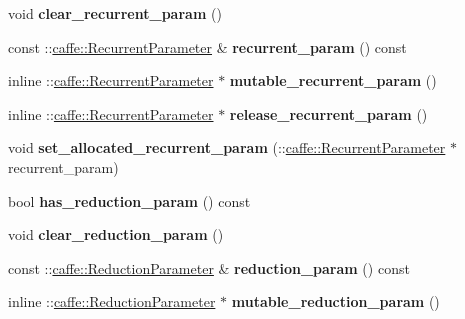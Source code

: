 \begin{DoxyCompactItemize}
void {\bfseries clear\+\_\+recurrent\+\_\+param} ()
\item 
\mbox{\label{classcaffe_1_1_layer_parameter_af2c30ec612074b330d4315ff9fb8c818}} 
const \+::\mbox{\hyperlink{classcaffe_1_1_recurrent_parameter}{caffe\+::\+Recurrent\+Parameter}} \& {\bfseries recurrent\+\_\+param} () const
\item 
\mbox{\label{classcaffe_1_1_layer_parameter_a5899b0c9e04294deaa4a78ba58ebeaf2}} 
inline \+::\mbox{\hyperlink{classcaffe_1_1_recurrent_parameter}{caffe\+::\+Recurrent\+Parameter}} $\ast$ {\bfseries mutable\+\_\+recurrent\+\_\+param} ()
\item 
\mbox{\label{classcaffe_1_1_layer_parameter_a5d28898329b3b4de6ce56c79c09db12f}} 
inline \+::\mbox{\hyperlink{classcaffe_1_1_recurrent_parameter}{caffe\+::\+Recurrent\+Parameter}} $\ast$ {\bfseries release\+\_\+recurrent\+\_\+param} ()
\item 
\mbox{\label{classcaffe_1_1_layer_parameter_a1b661a426e0b0e85becc3407dd0cd4a4}} 
void {\bfseries set\+\_\+allocated\+\_\+recurrent\+\_\+param} (\+::\mbox{\hyperlink{classcaffe_1_1_recurrent_parameter}{caffe\+::\+Recurrent\+Parameter}} $\ast$recurrent\+\_\+param)
\item 
\mbox{\label{classcaffe_1_1_layer_parameter_ae0542a2f20dec4af743a6673790809e9}} 
bool {\bfseries has\+\_\+reduction\+\_\+param} () const
\item 
\mbox{\label{classcaffe_1_1_layer_parameter_a7681bbbd117f3fb3079c35bd915fc158}} 
void {\bfseries clear\+\_\+reduction\+\_\+param} ()
\item 
\mbox{\label{classcaffe_1_1_layer_parameter_a297060903f1dd53bce7be8e487aa464b}} 
const \+::\mbox{\hyperlink{classcaffe_1_1_reduction_parameter}{caffe\+::\+Reduction\+Parameter}} \& {\bfseries reduction\+\_\+param} () const
\item 
\mbox{\label{classcaffe_1_1_layer_parameter_a35f2538a23412c1765de8e5f9213bd7b}} 
inline \+::\mbox{\hyperlink{classcaffe_1_1_reduction_parameter}{caffe\+::\+Reduction\+Parameter}} $\ast$ {\bfseries mutable\+\_\+reduction\+\_\+param} ()

\end{DoxyCompactItemize}
